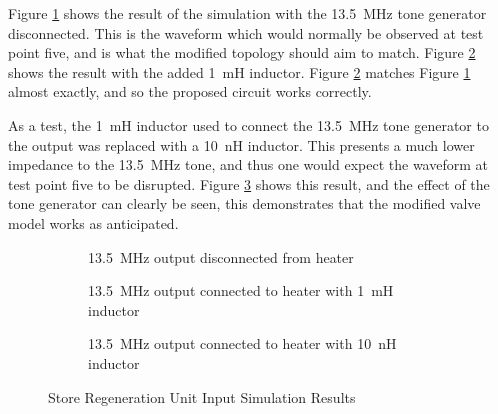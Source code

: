 Figure \ref{fig:rf-disconnected} shows the result of the simulation with the \SI{13.5}{\mega\hertz} tone generator disconnected. This is the waveform which would normally be observed at test point five, and is what the modified topology should aim to match. Figure \ref{fig:rf-1mh} shows the result with the added \SI{1}{\milli\henry} inductor. Figure \ref{fig:rf-1mh} matches Figure \ref{fig:rf-disconnected} almost exactly, and so the proposed circuit works correctly.

As a test, the \SI{1}{\milli\henry} inductor used to connect the \SI{13.5}{\mega\hertz} tone generator to the output was replaced with a \SI{10}{\nano\henry} inductor. This presents a much lower impedance to the \SI{13.5}{\mega\hertz} tone, and thus one would expect the waveform at test point five to be disrupted. Figure \ref{fig:rf-10nh} shows this result, and the effect of the tone generator can clearly be seen, this demonstrates that the modified valve model works as anticipated.

\begin{figure}[ht]
	\centering
	
	\begin{subfigure}[b]{\textwidth}
		\centering
		\caption{\SI{13.5}{\mega\hertz} output disconnected from heater}
		\label{fig:rf-disconnected}
	\end{subfigure}

	\begin{subfigure}[b]{\textwidth}
		\centering
		\caption{\SI{13.5}{\mega\hertz} output connected to heater with \SI{1}{\milli\henry} inductor}
		\label{fig:rf-1mh}
	\end{subfigure}

	\begin{subfigure}[b]{\textwidth}
		\centering
		\caption{\SI{13.5}{\mega\hertz} output connected to heater with \SI{10}{\nano\henry} inductor}
		\label{fig:rf-10nh}
	\end{subfigure}
	
	
	\caption{Store Regeneration Unit Input Simulation Results}
	\label{fig:store-regen-input-sim-res}
\end{figure}


